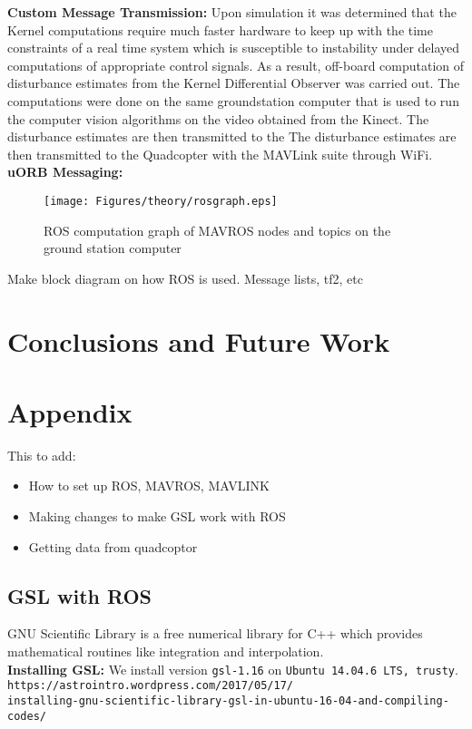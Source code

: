 \documentclass{article}
\begin{document}
\textbf{Custom Message Transmission:} Upon simulation it was determined that the Kernel computations require much faster hardware to keep up with the time constraints of a real time system which is susceptible to instability under delayed computations of appropriate control signals. As a result, off-board computation of disturbance estimates from the Kernel Differential Observer was carried out. The computations were done on the same groundstation computer that is used to run the computer vision algorithms on the video obtained from the Kinect. The disturbance estimates are then transmitted to the The disturbance estimates are then transmitted to the Quadcopter with the MAVLink suite through WiFi.\\
\textbf{uORB Messaging:} \\

\begin{figure}[H]
\centering
\texttt{[image: Figures/theory/rosgraph.eps]}
\caption{ROS computation graph of MAVROS nodes and topics on the ground station computer}
\label{rosgraph}
\end{figure}

Make block diagram on how ROS is used. Message lists, tf2, etc 

\section{Conclusions and Future Work}

\section{Appendix}
This to add: 
\begin{itemize}
	\item How to set up ROS, MAVROS, MAVLINK
	\item Making changes to make GSL work with ROS
	\item Getting data from quadcoptor 
\end{itemize}

\subsection{GSL with ROS}
GNU Scientific Library is a free numerical library for C++ which provides mathematical routines like integration and interpolation. 
\\\textbf{Installing GSL:} We install version \texttt{gsl-1.16} on \texttt{Ubuntu 14.04.6 LTS, trusty}.
\texttt{https://astrointro.wordpress.com/2017/05/17/ \\ installing-gnu-scientific-library-gsl-in-ubuntu-16-04-and-compiling-codes/}
\end{document}
